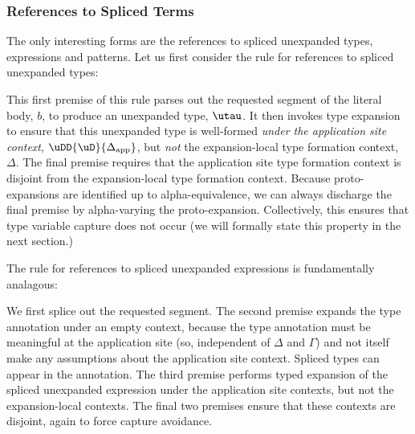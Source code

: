 \documentclass[acmlarge,review,anonymous]{acmart}\settopmatter{printfolios=true}
\begin{document}
\subsubsection{References to Spliced Terms} The only interesting forms are the references to spliced unexpanded types, expressions and patterns. Let us first consider the rule for references to spliced unexpanded types:
\begin{mathpar}
\end{mathpar}
This first premise of this rule parses out the requested segment of the literal body, $b$, to produce an unexpanded type, $\utau$. It then invokes type expansion to ensure that this unexpanded type is well-formed \emph{under the application site context}, $\uDD{\uD}{\Delta_\text{app}}$, but \emph{not} the expansion-local type formation context, $\Delta$.  The final premise requires that the application site type formation context is disjoint from the expansion-local type formation context. Because proto-expansions are identified up to alpha-equivalence, we can always discharge the final premise by alpha-varying the proto-expansion. Collectively, this ensures that type variable capture does not occur (we will formally state this property in the next section.) 

The rule for references to spliced unexpanded expressions is fundamentally analagous:
\begin{mathpar}
\end{mathpar}
We first splice out the requested segment. The second premise expands the type annotation under an empty context, because the type annotation must be meaningful at the application site (so, independent of $\Delta$ and $\Gamma$) and not itself make any assumptions about the application site context. Spliced types can appear in the annotation. The third premise performs typed expansion of the spliced unexpanded expression under the application site contexts, but not the expansion-local contexts. The final two premises ensure that these contexts are disjoint, again to force capture avoidance.
\end{document}
